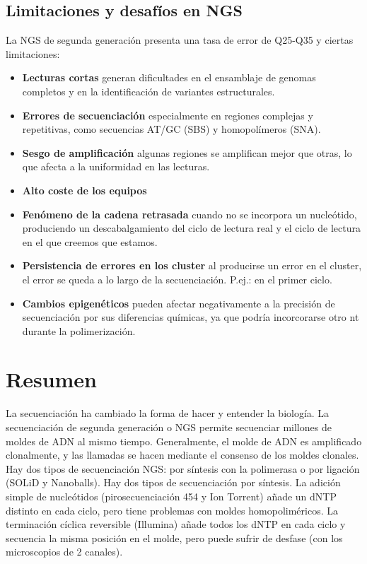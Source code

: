 \subsection{Limitaciones y desafíos en NGS}
La NGS de segunda generación presenta una tasa de error de Q25-Q35 y ciertas limitaciones:
\begin{itemize}
\item \textbf{Lecturas cortas} generan dificultades en el ensamblaje de genomas completos y en la identificación de variantes estructurales.
\item \textbf{Errores de secuenciación} especialmente en regiones complejas y repetitivas, como secuencias AT/GC (SBS) y homopolímeros (SNA).
\item \textbf{Sesgo de amplificación} algunas regiones se amplifican mejor que otras, lo que afecta a la uniformidad en las lecturas.
\item \textbf{Alto coste de los equipos}
\item \textbf{Fenómeno de la cadena retrasada} cuando no se incorpora un nucleótido, produciendo un descabalgamiento del ciclo de lectura real y el ciclo de lectura en el que creemos que estamos.
\item \textbf{Persistencia de errores en los cluster} al producirse un error en el cluster, el error se queda a lo largo de la secuenciación. P.ej.: en el primer ciclo.
\item \textbf{Cambios epigenéticos} pueden afectar negativamente a la precisión de secuenciación por sus diferencias químicas, ya que podría incorcorarse otro nt durante la polimerización. 
\end{itemize}

\section{Resumen}
La secuenciación ha cambiado la forma de hacer y entender la biología. La secuenciación de segunda generación o NGS permite secuenciar millones de moldes de ADN al mismo tiempo. Generalmente, el molde de ADN es amplificado clonalmente, y las llamadas se hacen mediante el consenso de los moldes clonales. Hay dos tipos de secuenciación NGS: por síntesis con la polimerasa o por ligación (SOLiD y Nanoballs). Hay dos tipos de secuenciación por síntesis. La adición simple de nucleótidos (pirosecuenciación 454 y Ion Torrent) añade un dNTP distinto en cada ciclo, pero tiene problemas con moldes homopoliméricos. La terminación cíclica reversible (Illumina) añade todos los dNTP en cada ciclo y secuencia la misma posición en el molde, pero puede sufrir de desfase (con los microscopios de 2 canales).

